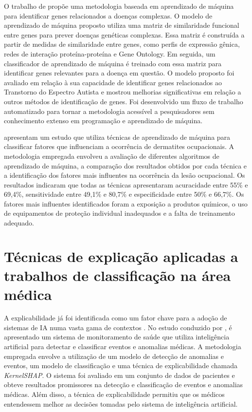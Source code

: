 O trabalho de  propõe uma metodologia baseada em aprendizado de máquina para identificar genes relacionados a doenças complexas. O modelo de aprendizado de máquina proposto utiliza uma matriz de similaridade funcional entre genes para prever doenças genéticas complexas. Essa matriz é construída a partir de medidas de similaridade entre genes, como perfis de expressão gênica, redes de interação proteína-proteína e Gene Ontology. Em seguida, um classificador de aprendizado de máquina é treinado com essa matriz para identificar genes relevantes para a doença em questão. O modelo proposto foi avaliado em relação à sua capacidade de identificar genes relacionados ao Transtorno do Espectro Autista e mostrou melhorias significativas em relação a outros métodos de identificação de genes. Foi desenvolvido um fluxo de trabalho automatizado para tornar a metodologia acessível a pesquisadores sem conhecimento extenso em programação e aprendizado de máquina.

 apresentam um estudo que utiliza técnicas de aprendizado de máquina para classificar fatores que influenciam a ocorrência de dermatites ocupacionais. A metodologia empregada envolveu a avaliação de diferentes algoritmos de aprendizado de máquina, a comparação dos resultados obtidos por cada técnica e a identificação dos fatores mais influentes na ocorrência da lesão ocupacional. Os resultados indicaram que todas as técnicas apresentaram acuracidade entre 55\% e 69,4\%, sensitividade entre 49,1\% e 80,7\% e especificidade entre 50\% e 66,7\%. Os fatores mais influentes identificados foram a exposição a produtos químicos, o uso de equipamentos de proteção individual inadequados e a falta de treinamento adequado.

\section{Técnicas de explicação aplicadas a trabalhos de classificação na área médica}\label{sec-context}

A explicabilidade já foi identificada como um fator chave para a adoção de sistemas de IA numa vasta gama de contextos \cite{doshivelez2017rigorous, lipton2017mythos, ribeiro2016modelagnostic}. No estudo conduzido por , é apresentado um sistema de monitoramento de saúde que utiliza inteligência artificial para detectar e classificar eventos e anomalias médicas. A metodologia empregada envolve a utilização de um modelo de detecção de anomalias e eventos, um modelo de classificação e uma técnica de explicabilidade chamada \textit{KernelSHAP}. O sistema foi avaliado em um conjunto de dados de pacientes e obteve resultados promissores na detecção e classificação de eventos e anomalias médicas. Além disso, a técnica de explicabilidade permitiu que os médicos entendessem melhor as decisões tomadas pelo sistema de inteligência artificial.

